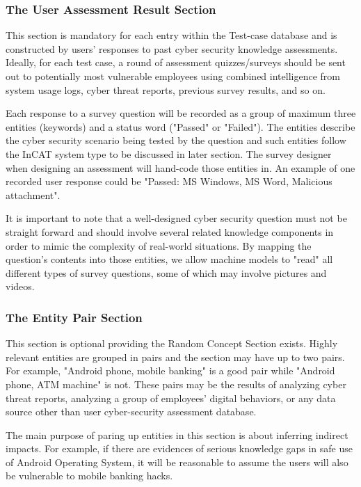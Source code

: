 \documentclass[conference]{IEEEtran}
\begin{document}
\subsubsection{The User Assessment Result Section}
This section is mandatory for each entry within the Test-case database and is constructed by users' responses to past cyber security knowledge assessments. Ideally, for each test case, a round of assessment quizzes/surveys should be sent out to potentially most vulnerable employees using combined intelligence from system usage logs, cyber threat reports, previous survey results, and so on.

Each response to a survey question will be recorded as a group of maximum three entities (keywords) and a status word ("Passed" or "Failed"). The entities describe the cyber security scenario being tested by the question and such entities follow the InCAT system type to be discussed in later section. The survey designer when designing an assessment will hand-code those entities in. An example of one recorded user response could be "Passed: MS Windows, MS Word, Malicious attachment".

It is important to note that a well-designed cyber security question must not be straight forward and should involve several related knowledge components in order to mimic the complexity of real-world situations. By mapping the question's contents into those entities, we allow machine models to "read" all different types of survey questions, some of which may involve pictures and videos.

\subsubsection{The Entity Pair Section}
This section is optional providing the Random Concept Section exists. Highly relevant entities are grouped in pairs and the section may have up to two pairs. For example, "Android phone, mobile banking" is a good pair while "Android phone, ATM machine" is not. These pairs may be the results of analyzing cyber threat reports, analyzing a group of employees' digital behaviors, or any data source other than user cyber-security assessment database.

The main purpose of paring up entities in this section is about inferring indirect impacts. For example, if there are evidences of serious knowledge gaps in safe use of Android Operating System, it will be reasonable to assume the users will also be vulnerable to mobile banking hacks.
\end{document}
